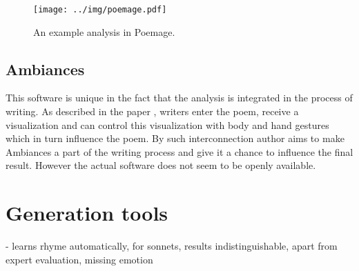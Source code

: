 \begin{figure}[h]\centering
	\texttt{[image: ../img/poemage.pdf]}
	\caption{An example analysis in Poemage.}\label{screenshotPoemage}
\end{figure}

\subsection{Ambiances}
This software is unique in the fact that the analysis is integrated in the process of writing. As described in the paper \cite{Meneses2015}, writers enter the poem, receive a visualization and can control this visualization with body and hand gestures which in turn influence the poem. By such interconnection author aims to make Ambiances a part of the writing process and give it a chance to influence the final result. However the actual software does not seem to be openly available.


\section{Generation tools}
\cite{lau2018deep} - learns rhyme automatically, for sonnets, results indistinguishable, apart from expert evaluation, missing emotion